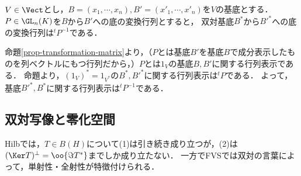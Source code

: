 \documentclass[uplatex, dvipdfmx]{jsreport}
\begin{document}
\begin{corollary}
    $V\in\Vect$とし，$B=(x_1,\cdots,x_n),B'=(x'_1,\cdots,x'_n)$を$V$の基底とする．$P\in\GL_n(K)$を$B$から$B'$への底の変換行列とすると，
    双対基底$B^*$から$B'^*$への底の変換行列は${}^tP^{-1}$である．
\end{corollary}
\begin{Proof}
    命題\ref{prop-transformation-matrix}より，（$P$とは基底$B'$を基底$B$で成分表示したものを列ベクトルにもつ行列だから，）$P$とは$1_V$の基底$B,B'$に関する行列表示である．
    命題より，$(1_V)^*=1_{V^*}$の$B^*,B'^*$に関する行列表示は${}^t\!P$である．
    よって，基底$B'^*,B^*$に関する行列表示は${}^t\!P^{-1}$である．
\end{Proof}

\subsection{双対写像と零化空間}

\begin{tcolorbox}[colframe=ForestGreen, colback=ForestGreen!10!white,breakable,colbacktitle=ForestGreen!40!white,coltitle=black,fonttitle=\bfseries\sffamily,
title=]
    Hilbでは，$T\in B(H)$について(1)は引き続き成り立つが，(2)は$(\Ker T)^\perp=\oo{\Im T^*}$までしか成り立たない．
    一方でFVSでは双対の言葉によって，単射性・全射性が特徴付けられる．
\end{tcolorbox}
\end{document}
